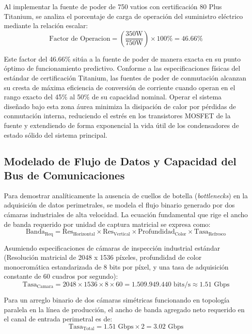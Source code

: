 \documentclass[12pt,letterpaper]{article}
\begin{document}
Al implementar la fuente de poder de 750 vatios con certificación 80 Plus Titanium, se analiza el porcentaje de carga de operación del suministro eléctrico mediante la relación escalar:
\begin{equation}
\text{Factor de Operacion} = \left( \frac{350\text{W}}{750\text{W}} \right) \times 100\% = 46.66\%
\end{equation}

Este factor del 46.66\% sitúa a la fuente de poder de manera exacta en su punto óptimo de funcionamiento predictivo. Conforme a las especificaciones físicas del estándar de certificación Titanium, las fuentes de poder de conmutación alcanzan su cresta de máxima eficiencia de conversión de corriente cuando operan en el rango exacto del 45\% al 50\% de su capacidad nominal. Operar el sistema diseñado bajo esta zona áurea minimiza la disipación de calor por pérdidas de conmutación interna, reduciendo el estrés en los transistores MOSFET de la fuente y extendiendo de forma exponencial la vida útil de los condensadores de estado sólido del sistema principal.

\subsection{Modelado de Flujo de Datos y Capacidad del Bus de Comunicaciones}
Para demostrar analíticamente la ausencia de cuellos de botella (\textit{bottlenecks}) en la adquisición de datos perimetrales, se modela el flujo binario generado por dos cámaras industriales de alta velocidad. La ecuación fundamental que rige el ancho de banda requerido por unidad de captura matricial se expresa como:
\begin{equation}
\text{Banda}_{\text{Req}} = \text{Res}_{\text{Horizontal}} \times \text{Res}_{\text{Vertical}} \times \text{Profundidad}_{\text{Color}} \times \text{Tasa}_{\text{Refresco}}
\end{equation}

Asumiendo especificaciones de cámaras de inspección industrial estándar (Resolución matricial de 2048 x 1536 píxeles, profundidad de color monocromática estandarizada de 8 bits por píxel, y una tasa de adquisición constante de 60 cuadros por segundo):
\begin{equation}
\text{Tasa}_{\text{Camara}} = 2048 \times 1536 \times 8 \times 60 = 1.509.949.440 \text{ bits/s} \approx 1.51 \text{ Gbps}
\end{equation}

Para un arreglo binario de dos cámaras simétricas funcionando en topología paralela en la línea de producción, el ancho de banda agregado neto requerido en el canal de entrada perimetral es de:
\begin{equation}
\text{Tasa}_{\text{Total}} = 1.51 \text{ Gbps} \times 2 = 3.02 \text{ Gbps}
\end{equation}
\end{document}

